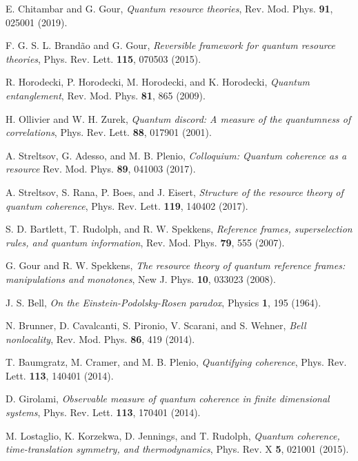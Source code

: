\documentclass[american,aps,pra,reprint, superscriptaddress]{revtex4-1}
\theoremstyle{plain}
\theoremstyle{definition}
\theoremstyle{remark}
\begin{document}
\begin{thebibliography}{99}%

 E. Chitambar and G. Gour, {\it Quantum resource theories}, Rev. Mod. Phys. {\bf 91}, 025001 (2019).

 F. G. S. L. Brand\~{a}o and G. Gour, {\it Reversible framework for quantum resource theories}, Phys. Rev. Lett. {\bf 115}, 070503 (2015).

 R. Horodecki, P. Horodecki, M. Horodecki, and K. Horodecki, {\it Quantum entanglement}, Rev. Mod. Phys. {\bf 81}, 865 (2009).

 H. Ollivier and W. H. Zurek, {\it Quantum discord: A measure of the quantumness of correlations}, Phys. Rev. Lett. {\bf 88}, 017901 (2001).

 A. Streltsov, G. Adesso, and M. B. Plenio, {\it Colloquium: Quantum coherence as a resource} Rev. Mod. Phys. {\bf 89}, 041003 (2017).

 A. Streltsov, S. Rana, P. Boes, and J. Eisert, {\it Structure of the resource theory of quantum coherence}, Phys. Rev. Lett. {\bf 119}, 140402 (2017).


 S. D. Bartlett, T. Rudolph, and R. W. Spekkens, {\it Reference frames, superselection rules, and quantum information}, Rev. Mod. Phys. {\bf 79}, 555 (2007).

 G. Gour and R. W. Spekkens, {\it The resource theory of quantum reference frames: manipulations and monotones}, New J. Phys. {\bf 10}, 033023 (2008).

 J. S. Bell, {\it On the Einstein-Podolsky-Rosen paradox}, Physics {\bf 1}, 195 (1964).

 N. Brunner, D. Cavalcanti, S. Pironio, V. Scarani, and S. Wehner, {\it Bell nonlocality}, Rev. Mod. Phys. {\bf 86}, 419 (2014).

 T. Baumgratz, M. Cramer, and M. B. Plenio,  {\it Quantifying coherence}, Phys. Rev. Lett. {\bf 113}, 140401 (2014).

 D. Girolami, {\it Observable measure of quantum coherence in finite dimensional systems}, Phys. Rev. Lett. {\bf 113}, 170401 (2014).

 M. Lostaglio, K. Korzekwa, D. Jennings, and T. Rudolph, {\it Quantum coherence, time-translation symmetry, and thermodynamics}, Phys. Rev. X {\bf 5}, 021001 (2015).


\end{thebibliography}
\end{document}
